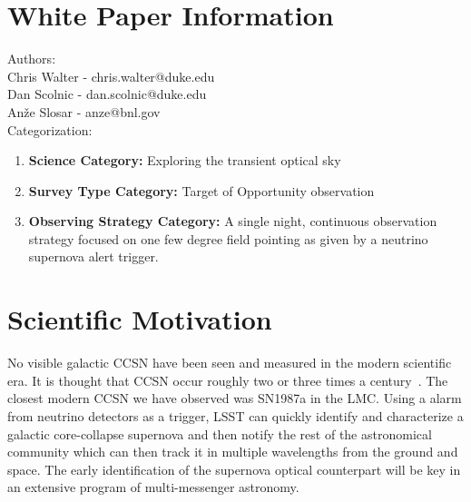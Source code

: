 \documentclass[12pt, letterpaper]{article}
\begin{document}
\section{White Paper Information}

\noindent
Authors: \\

\noindent
Chris Walter - chris.walter@duke.edu \\
Dan Scolnic - dan.scolnic@duke.edu \\
An\v{z}e Slosar - anze@bnl.gov \\

\noindent
Categorization: 
\begin{enumerate} 
\item {\bf Science Category:}  Exploring the transient optical sky
\item {\bf Survey Type Category:}  Target of Opportunity observation
\item {\bf Observing Strategy Category:}  A single night, continuous
  observation strategy focused on one few degree field pointing as given by
  a neutrino supernova alert trigger.
\end{enumerate}  

\clearpage

\section{Scientific Motivation}
\label{sec:motivation}

No visible galactic CCSN have been seen and measured in the modern
scientific era. It is thought that CCSN occur roughly two or three
times a century~\cite{1994ApJS...92..487T, 2001ASSL..264..199C}.  The
closest modern CCSN we have observed was SN1987a in the LMC.  Using a
alarm from neutrino detectors as a trigger, LSST can quickly identify
and characterize a galactic core-collapse supernova and then notify
the rest of the astronomical community which can then track it in
multiple wavelengths from the ground and space.  The early
identification of the supernova optical counterpart will be key in an
extensive program of multi-messenger astronomy.
\end{document}

